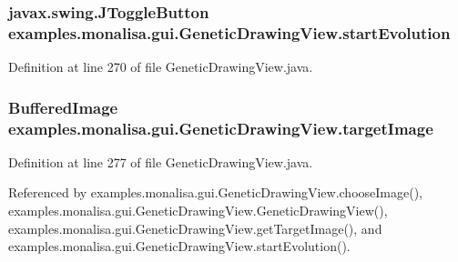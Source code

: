 \hypertarget{classexamples_1_1monalisa_1_1gui_1_1_genetic_drawing_view_a9ff624a5edfba908832ebc62da74177d}{
\subsubsection[{start\-Evolution}]{\setlength{\rightskip}{0pt plus 5cm}javax.\-swing.\-J\-Toggle\-Button examples.\-monalisa.\-gui.\-Genetic\-Drawing\-View.\-start\-Evolution\hspace{0.3cm}{\ttfamily [private]}}}\label{classexamples_1_1monalisa_1_1gui_1_1_genetic_drawing_view_a9ff624a5edfba908832ebc62da74177d}


Definition at line 270 of file Genetic\-Drawing\-View.\-java.

\hypertarget{classexamples_1_1monalisa_1_1gui_1_1_genetic_drawing_view_a57e882dc484b79602829ccf81c8c88dc}{
\subsubsection[{target\-Image}]{\setlength{\rightskip}{0pt plus 5cm}Buffered\-Image examples.\-monalisa.\-gui.\-Genetic\-Drawing\-View.\-target\-Image\hspace{0.3cm}{\ttfamily [private]}}}\label{classexamples_1_1monalisa_1_1gui_1_1_genetic_drawing_view_a57e882dc484b79602829ccf81c8c88dc}


Definition at line 277 of file Genetic\-Drawing\-View.\-java.



Referenced by examples.\-monalisa.\-gui.\-Genetic\-Drawing\-View.\-choose\-Image(), examples.\-monalisa.\-gui.\-Genetic\-Drawing\-View.\-Genetic\-Drawing\-View(), examples.\-monalisa.\-gui.\-Genetic\-Drawing\-View.\-get\-Target\-Image(), and examples.\-monalisa.\-gui.\-Genetic\-Drawing\-View.\-start\-Evolution().

